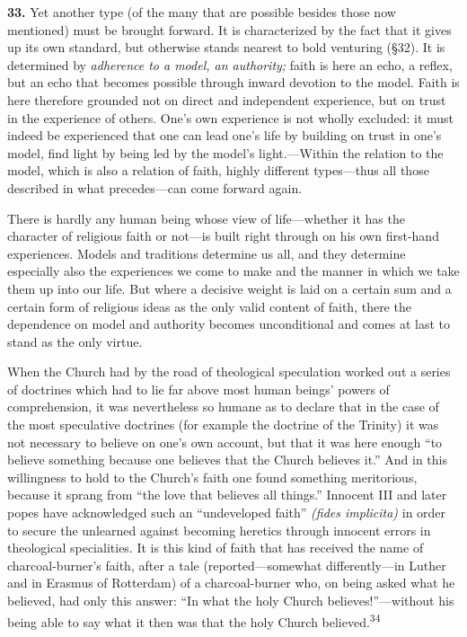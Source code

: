 \documentclass[12pt,a4paper]{book}
\newcommand{\opage}[1]{\marginnote{\footnotesize\textit{[#1]}}}
\begin{document}
\medskip

\noindent\textbf{33.} Yet another type (of the many that are possible besides
those now mentioned) must be brought forward. It is characterized by the fact that
it gives up its own standard, but otherwise stands nearest to bold venturing
(§32). It is determined by \emph{adherence to a model, an authority;} faith is
here an echo, a reflex, but an echo that becomes possible through inward devotion
to the model. Faith is here therefore grounded not on direct and independent
experience, but on trust in the experience of others. One's own experience is not
wholly excluded: it must indeed be experienced that one can lead one's life by
building on trust in one's model, find light by being led by the model's
light.---Within the relation to the model, which is also a relation of faith,
highly different types---thus all those described in what precedes---can come
forward again.

There is hardly any human being whose view of life---whether 
\opage{79}it has the character
of religious faith or not---is built right through on his own first-hand
experiences. Models and traditions determine us all, and they determine
especially also the experiences we come to make and the manner in which we take
them up into our life. But where a decisive weight is laid on a certain sum and a
certain form of religious ideas as the only valid content of faith, there the
dependence on model and authority becomes unconditional and comes at last to
stand as the only virtue.

When the Church had by the road of theological speculation worked out a series of
doctrines which had to lie far above most human beings' powers of comprehension,
it was nevertheless so humane as to declare that in the case of the most
speculative doctrines (for example the doctrine of the Trinity) it was not
necessary to believe on one's own account, but that it was here enough ``to
believe something because one believes that the Church believes it.'' And in this
willingness to hold to the Church's faith one found something meritorious, because
it sprang from ``the love that believes all things.'' Innocent III and later popes
have acknowledged such an ``undeveloped faith'' \emph{(fides implicita)} in order
to secure the unlearned against becoming heretics through innocent errors in
theological specialities. It is this kind of faith that has received the name of
charcoal-burner's faith, after a tale (reported---somewhat differently---in Luther
and in Erasmus of Rotterdam) of a charcoal-burner who, on being asked what he
believed, had only this answer: ``In what the holy Church believes!''---without
his being able to say what it then was that the holy Church
believed.\textsuperscript{34}
\end{document}
